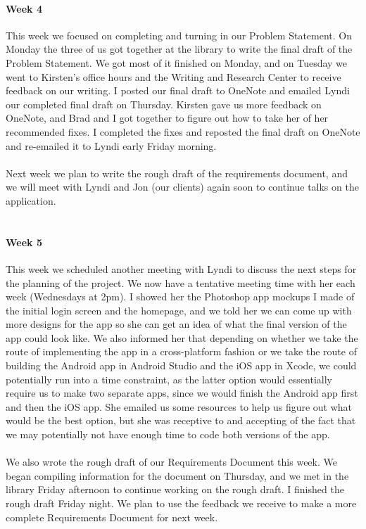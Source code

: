 \documentclass[onecolumn, draftclsnofoot,10pt, compsoc]{IEEEtran}
\begin{document}
      \paragraph{Week 4}
      This week we focused on completing and turning in our Problem Statement. On Monday the three of us got together at the library to write the final draft of the Problem Statement. We got most of it finished on Monday, and on Tuesday we went to Kirsten's office hours and the Writing and Research Center to receive feedback on our writing. I posted our final draft to OneNote and emailed Lyndi our completed final draft on Thursday. Kirsten gave us more feedback on OneNote, and Brad and I got together to figure out how to take her of her recommended fixes. I completed the fixes and reposted the final draft on OneNote and re-emailed it to Lyndi early Friday morning. \\ \\
      Next week we plan to write the rough draft of the requirements document, and we will meet with Lyndi and Jon (our clients) again soon to continue talks on the application. \\ \\

      \paragraph{Week 5}
      This week we scheduled another meeting with Lyndi to discuss the next steps for the planning of the project. We now have a tentative meeting time with her each week (Wednesdays at 2pm). I showed her the Photoshop app mockups I made of the initial login screen and the homepage, and we told her we can come up with more designs for the app so she can get an idea of what the final version of the app could look like. We also informed her that depending on whether we take the route of implementing the app in a cross-platform fashion or we take the route of building the Android app in Android Studio and the iOS app in Xcode, we could potentially run into a time constraint, as the latter option would essentially require us to make two separate apps, since we would finish the Android app first and then the iOS app. She emailed us some resources to help us figure out what would be the best option, but she was receptive to and accepting of the fact that we may potentially not have enough time to code both versions of the app. \\ \\
      We also wrote the rough draft of our Requirements Document this week. We began compiling information for the document on Thursday, and we met in the library Friday afternoon to continue working on the rough draft. I finished the rough draft Friday night. We plan to use the feedback we receive to make a more complete Requirements Document for next week. \\ \\
\end{document}
